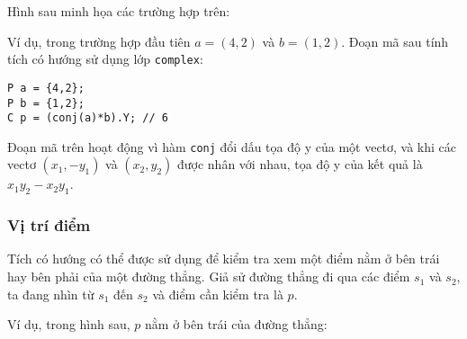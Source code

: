 Hình sau minh họa các trường hợp trên:
\begin{center}
\end{center}

\noindent
Ví dụ, trong trường hợp đầu tiên
$a=(4,2)$ và $b=(1,2)$.
Đoạn mã sau tính tích có hướng
sử dụng lớp \texttt{complex}:

\begin{lstlisting}
P a = {4,2};
P b = {1,2};
C p = (conj(a)*b).Y; // 6
\end{lstlisting}

Đoạn mã trên hoạt động vì
hàm \texttt{conj} đổi dấu tọa độ y
của một vectơ,
và khi các vectơ $(x_1,-y_1)$ và $(x_2,y_2)$
được nhân với nhau, tọa độ y
của kết quả là $x_1 y_2 - x_2 y_1$.

\subsubsection{Vị trí điểm}

Tích có hướng có thể được sử dụng để kiểm tra
xem một điểm nằm ở bên trái hay bên phải
của một đường thẳng.
Giả sử đường thẳng đi qua các điểm
$s_1$ và $s_2$, ta đang nhìn từ $s_1$
đến $s_2$ và điểm cần kiểm tra là $p$.

Ví dụ, trong hình sau,
$p$ nằm ở bên trái của đường thẳng:
\begin{center}
\end{center}

